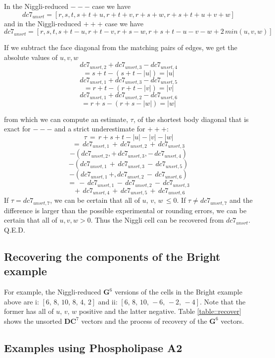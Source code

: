 \documentclass[preprint]{iucr}              %
\begin{document}
In the Niggli-reduced $---$ case we have
\begin{equation}
  dc7_{unsrt} = [r,s,t,s+t+u,r+t+v,r+s+w,r+s+t+u+v+w]
  \label{mmm}
\end{equation}
and in the Niggli-reduced $+++$ case we have
\begin{equation}
dc7_{unsrt} = [r,s,t,s+t-u,r+t-v,r+s-w,r+s+t-u-v-w+2\,min(u,v,w)]
  \label{ppp}
\end{equation}


If we subtract the face diagonal from the matching pairs of edges, we get the
absolute values of $u,v,w$
\[
dc7_{unsrt,2}+dc7_{unsrt,3}-dc7_{unsrt,4} 
\]
\[
= s+t-(s+t-|u|)=|u|
\]
\[
dc7_{unsrt,1}+dc7_{unsrt,3}-dc7_{unsrt,5}
\]
\[
= r+t-(r+t-|v|)=|v|
\]
\[
dc7_{unsrt,1}+dc7_{unsrt,2}-dc7_{unsrt,6}
\]
\[
= r+s-(r+s-|w|)=|w|
\]

\noindent{}from which we can compute an estimate, $\tau$, of the shortest
body diagonal that is exact for $---$ and a strict underestimate
for $+++$:
\[\tau\,= \,r+s+t-|u|-|v|-|w|\]
\[=\,dc7_{unsrt,1}\,+\,dc7_{unsrt,2}\,+\,dc7_{unsrt,3} \]
\[ -(dc7_{unsrt,2},+\,dc7_{unsrt,3},-\,dc7_{unsrt,4})\]
\[ -(dc7_{unsrt,1}\,+\,dc7_{unsrt,3}\,-\,dc7_{unsrt,5})\]
\[ -(dc7_{unsrt,1}\,+,dc7_{unsrt,2}\,-\,dc7_{unsrt,6})\]
\[=\,-\,dc7_{unsrt,1}\,-\,dc7_{unsrt,2}\,-\,dc7_{unsrt,3}\]
\[\,+\,dc7_{unsrt,4}\,+\,dc7_{unsrt,5}\,+ \,dc7_{unsrt,6}\]
  If $\tau=dc7_{unsrt,7}$,
we can be certain that all of $u,\,v,\,w\, \leq 0$.  If  $\tau \neq dc7_{unsrt,7}$ and the difference is larger than the possible experimental
or rounding errors, we can be certain that all of $u,v,w > 0$.  Thus the
Niggli cell can be recovered from $dc7_{unsrt}$.
Q.E.D.

\subsection{Recovering the components of the Bright example}

For example, the Niggli-reduced $\mathbf{G}^6$ versions of the cells in the
Bright example above are i: $ [ 6,\, 8,\, 10,\, 8,\, 4,\, 2] $ and ii: $ [ 6,\, 8,\, 10,\, -6,\, -2,\, -4 ]$.
Note that the former has all of $u,\, v,\, w$ positive and the latter negative.
Table \ref{table::recover} shows the unsorted $\mathbf{DC}^7$ vectors
and the process of recovery of the $\mathbf{G}^6$ vectors.

\subsection{Examples using Phospholipase A2}
\end{document}
